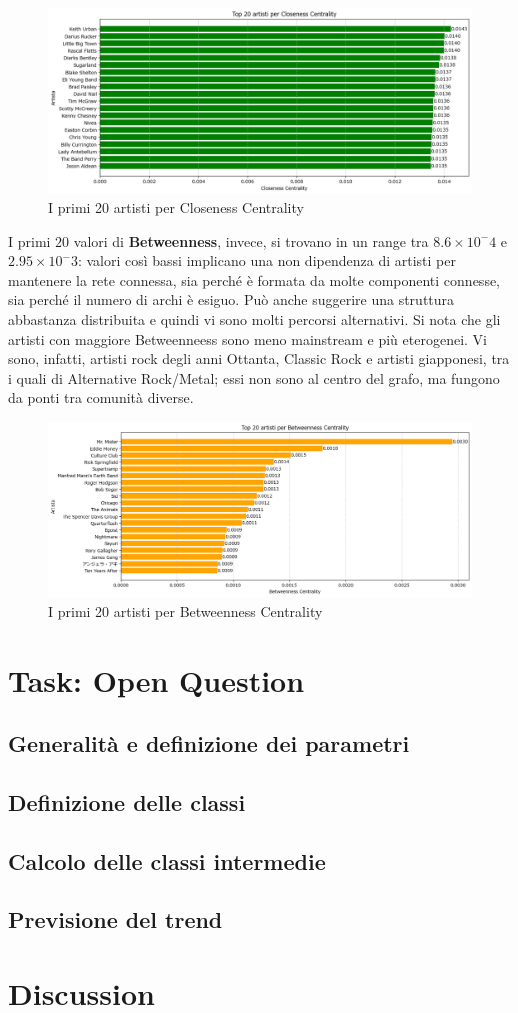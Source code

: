 \documentclass[sigchi]{acmart}
\begin{document}
\begin{figure}[H]
\centering
\includegraphics[width=0.45
\textwidth]{../network_analysis/plots/2_7/top20Clness.png}
\caption{I primi 20 artisti per Closeness Centrality}
\label{fig:top20Clness}
\end{figure}

\noindent I primi $20$ valori di {\bfseries Betweenness}, invece, si trovano in un range tra $8.6 \times 10^-4$ e $2.95 \times 10^-3$: valori così bassi implicano una non dipendenza di artisti per mantenere la rete connessa, sia perché è formata da molte componenti connesse, sia perché il numero di archi è esiguo. Può anche suggerire una struttura abbastanza distribuita e quindi vi sono molti percorsi alternativi. Si nota che gli artisti con maggiore Betweenneess sono meno mainstream e più eterogenei. Vi sono, infatti, artisti rock degli anni Ottanta, Classic Rock e artisti giapponesi, tra i quali di Alternative Rock/Metal; essi non sono al centro del grafo, ma fungono da ponti tra comunità diverse.

\begin{figure}[H]
\centering
\includegraphics[width=0.45
\textwidth]{../network_analysis/plots/2_7/top20Btwnss.png}
\caption{I primi 20 artisti per Betweenness Centrality}
\label{fig:top20Btwnss}
\end{figure}

\section{Task: Open Question}


\subsection{Generalità e definizione dei parametri}


\subsection{Definizione delle classi}


\subsection{Calcolo delle classi intermedie}


\subsection{Previsione del trend}


\section{Discussion}




\end{document}
